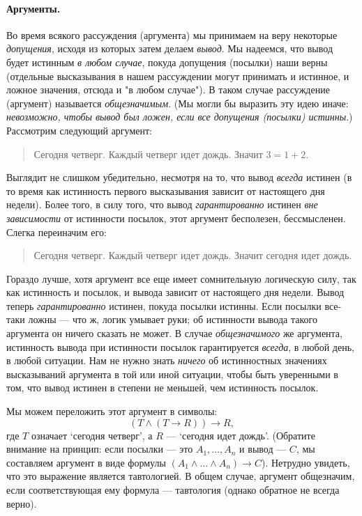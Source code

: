 \documentclass[12pt,notitlepage]{article}
\theoremstyle{plain}
\theoremstyle{definition}
\theoremstyle{plain}
\newcommand{\1}{\mathbf{1}}
\newcommand{\0}{\mathbf{0}}
\newcommand{\mcomm}[1]{}
\begin{document}
\paragraph{Аргументы.} Во время всякого рассуждения (аргумента) мы принимаем на веру некоторые \emph{допущения}, исходя из которых затем делаем \emph{вывод}. Мы надеемся, что вывод будет истинным \emph{в любом случае}, покуда допущения (посылки) наши верны (отдельные высказывания в нашем рассуждении могут принимать и истинное, и ложное значения, отсюда и "в любом случае"). В таком случае рассуждение (аргумент) называется \emph{общезначимым}. (Мы могли бы выразить эту идею иначе: \emph{невозможно, чтобы вывод был ложен, если все допущения (посылки) истинны}.) Рассмотрим следующий аргумент:
\begin{quote}
	Сегодня четверг. Каждый четверг идет дождь. Значит $3 = 1 + 2$.
\end{quote}
Выглядит не слишком убедительно, несмотря на то, что вывод \emph{всегда} истинен (в то время как истинность первого высказывания зависит от настоящего дня недели). Более того, в силу того, что вывод \emph{гарантированно} истинен \emph{вне зависимости} от истинности посылок, этот аргумент бесполезен, бессмысленен. Слегка переиначим его:
\begin{quote}
	Сегодня четверг. Каждый четверг идет дождь. Значит сегодня идет дождь.
\end{quote}
Гораздо лучше, хотя аргумент все еще имеет сомнительную логическую силу, так как истинность и посылок, и вывода зависит от настоящего дня недели. Вывод теперь \emph{гарантированно} истинен, покуда посылки истинны. Если посылки все-таки ложны --- что ж, логик умывает руки; об истинности вывода такого аргумента он ничего сказать не может. В случае \emph{общезначимого} же аргумента, истинность вывода при истинности посылок гарантируется \emph{всегда}, в любой день, в любой ситуации. Нам не нужно знать \emph{ничего} об истинностных значениях высказываний аргумента в той или иной ситуации, чтобы быть уверенными в том, что вывод истинен в степени не меньшей, чем истинность посылок.

\mcomm{}

Мы можем переложить этот аргумент в символы:
$$(T \wedge (T \to R)) \to R,$$
где $T$ означает `сегодня четверг', а $R$ --- `сегодня идет дождь'. (Обратите внимание на принцип: если посылки --- это $A_1, \ldots, A_n$ и вывод --- $C$, мы составляем аргумент в виде формулы $(A_1 \wedge  \ldots \wedge A_n) \to C$). Нетрудно увидеть, что это выражение является тавтологией. В общем случае, аргумент общезначим, если соответствующая ему формула --- тавтология (однако обратное не всегда верно).
\end{document}
